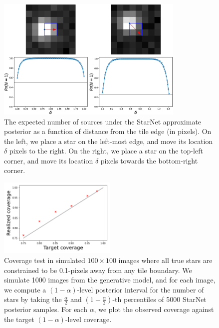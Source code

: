 \begin{figure}[tb]
    \centering
    \includegraphics[width=0.8\textwidth]{./figures_vg/coverage/edges_example.eps}
    \caption{The expected number of sources under the StarNet approximate posterior as a function of distance from the 
    tile edge (in pixels).
    On the left, we place a star on the left-most edge, and move its location $\delta$ pixels to the right.
    On the right, we place a star on the top-left corner, and move its location $\delta$ pixels towards the bottom-right corner.}
    \label{fig:starnet_edges}
\end{figure}

\begin{figure}[tb]
    \centering
    \includegraphics[width=0.5\textwidth]{./figures/coverage/good_coverage.png}
    \caption{Coverage test in simulated $100\times100$ images where all true stars are constrained to be 0.1-pixels away from any tile
    boundary.
    We simulate 1000 images from the generative model, and for each image, we compute a $(1 - \alpha)$-level posterior interval for the number of stars by taking the $\frac{\alpha}{2}$ and $(1 -\frac{\alpha}{2})$-th percentiles of 5000 StarNet posterior samples.
    For each $\alpha$, we plot the observed coverage against the target $(1 - \alpha)$-level coverage. }
    \label{fig:coverage_good}
\end{figure}

